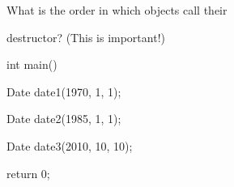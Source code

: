 What is the order in which objects call their

destructor? (This is important!)



\begin{consolethree}[escapeinside=||]

int main()

{

    Date date1(1970, 1, 1);

    Date date2(1985, 1, 1);

    Date date3(2010, 10, 10);

    return 0;

}

\end{consolethree}

